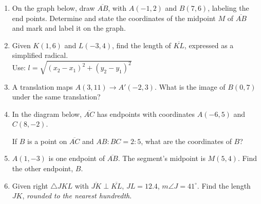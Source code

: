 \documentclass[12pt, twoside]{article}
\begin{document}
\begin{enumerate}
  \item On the graph below, draw $\overline{AB}$, with $A(-1,2)$ and $B(7,6)$, labeling the end points. Determine and state the coordinates of the midpoint $M$ of $\overline{AB}$ and mark and label it on the graph.\\

  \item Given $K(1,6)$ and $L(-3,4)$, find the length of $\overline{KL}$, expressed as a simplified radical.\\[0.25cm]
  Use: $l=\sqrt{(x_2-x_1)^2+(y_2-y_1)^2}$
      \vspace{4cm}

  \item A translation maps $A(3,11) \rightarrow A'(-2,3)$. What is the image of $B(0,7)$ under the same translation?  \vspace{3cm}


  \item In the diagram below, $\overline{AC}$ has endpoints with coordinates $A(-6,5)$ and $C(8, -2)$.
    \begin{center} %
    \end{center}
    If $B$ is a point on $\overline{AC}$ and $AB {:} BC = 2{:}5$,  what  are  the coordinates of $B$? \vspace{4cm}


  \item $A(1,-3)$ is one endpoint of $\overline{AB}$. The segment's midpoint is $M(5,4)$. Find the other endpoint, $B$. \vspace{3cm}


  \newpage

  \item Given right $\triangle JKL$ with $\overline{JK} \perp \overline{KL}$, $JL=12.4$, $m\angle J=41^\circ$. Find the length $JK$, \emph{rounded to the nearest hundredth}.
    \begin{center}
    \end{center}
\vspace{1cm}


\end{enumerate}
\end{document}
